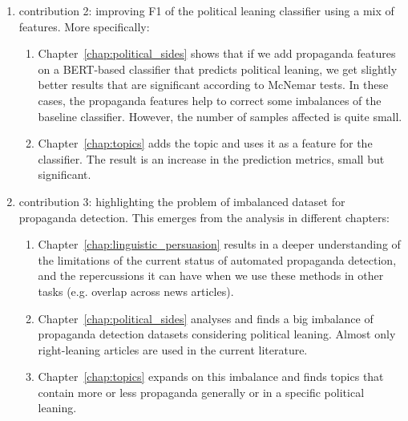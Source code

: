 \begin{enumerate}
\begin{enumerate}
    \end{enumerate}
    \item contribution 2: improving F1 of the political leaning classifier using a mix of features. More specifically:
    \begin{enumerate}
        \item Chapter~\ref{chap:political_sides}  shows that if we add propaganda features on a BERT-based classifier that predicts political leaning, we get slightly better results that are significant according to McNemar tests. In these cases, the propaganda features help to correct some imbalances of the baseline classifier. However, the number of samples affected is quite small.
        \item Chapter~\ref{chap:topics} adds the topic and uses it as a feature for the classifier. The result is an increase in the prediction metrics, small but significant.
    \end{enumerate}
    \item contribution 3: highlighting the problem of imbalanced dataset for propaganda detection. This emerges from the analysis in different chapters:
    \begin{enumerate}
        \item Chapter~\ref{chap:linguistic_persuasion} results in a deeper understanding of the limitations of the current status of automated propaganda detection, and the repercussions it can have when we use these methods in other tasks (e.g. overlap across news articles).
        \item Chapter~\ref{chap:political_sides} analyses and finds a big imbalance of propaganda detection datasets considering political leaning. Almost only right-leaning articles are used in the current literature.
        \item Chapter~\ref{chap:topics} expands on this imbalance and finds topics that contain more or less propaganda generally or in a specific political leaning.
    \end{enumerate}


\end{enumerate}
